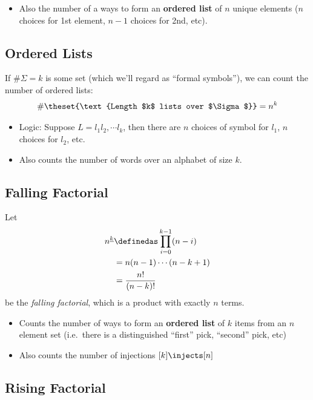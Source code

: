 \begin{itemize}
\tightlist
\item
  Also the number of a ways to form an \textbf{ordered list} of \(n\)
  unique elements (\(n\) choices for 1st element, \(n-1\) choices for
  2nd, etc).
\end{itemize}

\hypertarget{ordered-lists}{%
\subsection{Ordered Lists}\label{ordered-lists}}

If \(\#\Sigma = k\) is some set (which we'll regard as ``formal
symbols''), we can count the number of ordered lists: \[
\# \theset{\text{Length $k$ lists over $\Sigma$}} = n^k
\]

\begin{itemize}
\tightlist
\item
  Logic: Suppose \(L = l_1 l_2, \cdots l_k\), then there are \(n\)
  choices of symbol for \(l_1\), \(n\) choices for \(l_2\), etc.
\item
  Also counts the number of words over an alphabet of size \(k\).
\end{itemize}

\hypertarget{falling-factorial}{%
\subsection{Falling Factorial}\label{falling-factorial}}

Let \[\begin{aligned}
n^{\underline k} &\definedas \prod_{i=0}^{k-1}(n - i) \\
&= n(n-1)\cdots (n-k+1) \\
&= \frac{n!}{(n-k)!}
\end{aligned}\] be the \emph{falling factorial}, which is a product with
exactly \(n\) terms.

\begin{itemize}
\tightlist
\item
  Counts the number of ways to form an \textbf{ordered list} of \(k\)
  items from an \(n\) element set (i.e.~there is a distinguished
  ``first'' pick, ``second'' pick, etc)
\item
  Also counts the number of injections \([k] \injects [n]\)
\end{itemize}

\hypertarget{rising-factorial}{%
\subsection{Rising Factorial}\label{rising-factorial}}

